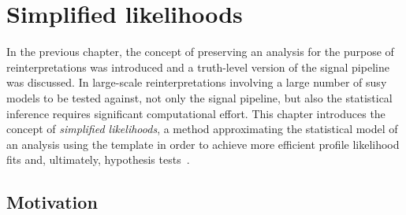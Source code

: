 


\chapter{Simplified likelihoods}\label{ch:simplify}

\graphicspath{{chapter-simplify/Figs/Vector/}{chapter-simplify/Figs/}}

In the previous chapter, the concept of preserving an analysis for the purpose of reinterpretations was introduced and a truth-level version of the signal pipeline was discussed. In large-scale reinterpretations involving a large number of \gls{susy} models to be tested against, not only the signal pipeline, but also the statistical inference requires significant computational effort. 
This chapter introduces the concept of \textit{simplified likelihoods}, a method approximating the statistical model of an analysis using the  template in order to achieve more efficient profile likelihood fits and, ultimately, hypothesis tests~\cite{Schanet:2758958}.

\section{Motivation}\label{sec:simplified_likelihood_motivation}

